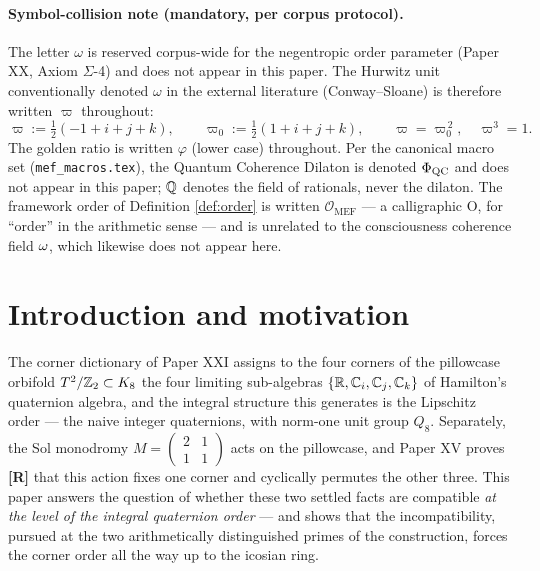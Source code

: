 \documentclass[11pt,a4paper]{article}
\theoremstyle{plain}
\theoremstyle{definition}
\theoremstyle{remark}
\newcommand{\OrderMEF}{\mathcal{O}_{\mathrm{MEF}}}
\newcommand{\rtag}[1]{\textnormal{\textbf{[#1]}}}
\begin{document}
\paragraph{Symbol-collision note (mandatory, per corpus protocol).}
The letter $\omega$ is reserved corpus-wide for the negentropic order parameter (Paper XX, Axiom $\Sigma$-4) and does not appear in this paper. The Hurwitz unit conventionally denoted $\omega$ in the external literature (Conway--Sloane) is therefore written $\varpi$ throughout:
\begin{equation}\label{eq:varpi}
\varpi := \tfrac12(-1+i+j+k), \qquad
\varpi_0 := \tfrac12(1+i+j+k), \qquad
\varpi = \varpi_0^{\,2}, \quad \varpi^3 = 1.
\end{equation}
The golden ratio is written $\varphi$ (lower case) throughout. Per the canonical macro set (\texttt{mef\_macros.tex}), the Quantum Coherence Dilaton is denoted $\Phi_{\mathrm{QC}}$ and does not appear in this paper; $\mathbb{Q}$ denotes the field of rationals, never the dilaton. The framework order of Definition \ref{def:order} is written $\OrderMEF$ --- a calligraphic O, for ``order'' in the arithmetic sense --- and is unrelated to the consciousness coherence field $\omega$, which likewise does not appear here.

\tableofcontents

\section{Introduction and motivation}\label{sec:intro}

The corner dictionary of Paper XXI \cite{PaperXXI} assigns to the four corners of the pillowcase orbifold $T^2/\mathbb{Z}_2 \subset K_8$ the four limiting sub-algebras $\{\mathbb{R}, \mathbb{C}_i, \mathbb{C}_j, \mathbb{C}_k\}$ of Hamilton's quaternion algebra, and the integral structure this generates is the Lipschitz order --- the naive integer quaternions, with norm-one unit group $Q_8$. Separately, the Sol monodromy $M = \left(\begin{smallmatrix}2&1\\1&1\end{smallmatrix}\right)$ acts on the pillowcase, and Paper XV \cite{PaperXV} proves \rtag{R} that this action fixes one corner and cyclically permutes the other three. This paper answers the question of whether these two settled facts are compatible \emph{at the level of the integral quaternion order} --- and shows that the incompatibility, pursued at the two arithmetically distinguished primes of the construction, forces the corner order all the way up to the icosian ring.
\end{document}
